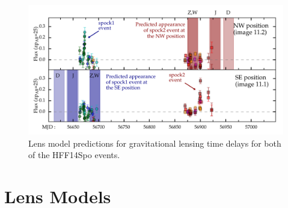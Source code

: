 \begin{figure}
\begin{center}
\includegraphics[width=\columnwidth]{figures/spock_predictions.png}
\caption{Lens model predictions for gravitational lensing time delays for both of the HFF14Spo events.}
\end{center}
\end{figure}


\section{Lens Models}\label{sec:LensModels}



  
  
  
  
  
